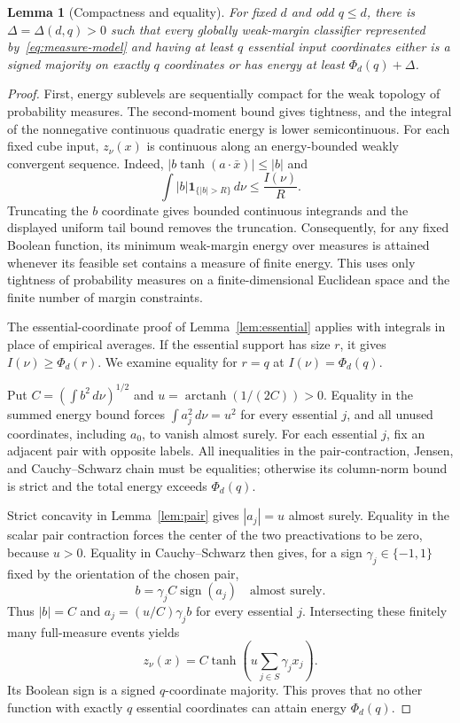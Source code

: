 \documentclass[11pt]{article}
\newtheorem{lemma}[theorem]{Lemma}
\newcommand{\sgn}{\operatorname{sign}}
\begin{document}
\begin{lemma}[Compactness and equality]\label{lem:compact-gap}
For fixed $d$ and odd $q\le d$, there is $\Delta=\Delta(d,q)>0$
such that every globally weak-margin classifier represented
by~\eqref{eq:measure-model} and having at least $q$ essential input
coordinates either is a signed majority on exactly $q$ coordinates
or has energy at least $\Phi_d(q)+\Delta$.
\end{lemma}
\begin{proof}
First, energy sublevels are sequentially compact for the weak topology
of probability measures. The second-moment bound gives tightness, and
the integral of the nonnegative continuous quadratic energy is lower
semicontinuous. For each fixed cube input, $z_\nu(x)$ is continuous
along an energy-bounded weakly convergent sequence. Indeed,
$|b\tanh(a\cdot\bar x)|\le|b|$ and
\[
 \int |b|\mathbf1_{\{|b|>R\}}\,d\nu\le\frac{I(\nu)}R.
\]
Truncating the $b$ coordinate gives bounded continuous integrands and
the displayed uniform tail bound removes the truncation. Consequently,
for any fixed Boolean function, its minimum weak-margin energy over
measures is attained whenever its feasible set contains a measure of
finite energy. This uses only tightness of probability measures on a
finite-dimensional Euclidean space and the finite number of margin
constraints.

The essential-coordinate proof of Lemma~\ref{lem:essential} applies
with integrals in place of empirical averages. If the essential support
has size $r$, it gives $I(\nu)\ge\Phi_d(r)$. We examine equality for
$r=q$ at $I(\nu)=\Phi_d(q)$.

Put $C=(\int b^2\,d\nu)^{1/2}$ and
$u=\operatorname{arctanh}(1/(2C))>0$. Equality in the summed energy
bound forces $\int a_j^2\,d\nu=u^2$ for every essential $j$, and
all unused coordinates, including $a_0$, to vanish almost surely.
For each essential $j$, fix an adjacent pair with opposite labels.
All inequalities in the pair-contraction, Jensen, and Cauchy--Schwarz
chain must be equalities; otherwise its column-norm bound is strict
and the total energy exceeds $\Phi_d(q)$.

Strict concavity in Lemma~\ref{lem:pair} gives $|a_j|=u$ almost surely.
Equality in the scalar pair contraction forces the center of the two
preactivations to be zero, because $u>0$.
Equality in Cauchy--Schwarz then gives, for a sign
$\gamma_j\in\{-1,1\}$ fixed by the orientation of the chosen pair,
\[
 b=\gamma_j C\sgn(a_j)\quad\text{almost surely}.
\]
Thus $|b|=C$ and $a_j=(u/C)\gamma_j b$ for every essential $j$.
Intersecting these finitely many full-measure events yields
\[
 z_\nu(x)
 =C\tanh\!\left(u\sum_{j\in S}\gamma_jx_j\right).
\]
Its Boolean sign is a signed $q$-coordinate majority. This proves
that no other function with exactly $q$ essential coordinates can
attain energy $\Phi_d(q)$.


\end{proof}
\end{document}
